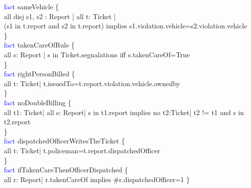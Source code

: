 \textcolor{blue}{fact}
\textcolor{mycolor}{sameVehicle} \{\\
all disj s1, s2 : Report | all t: Ticket |\\
(s1 in t.report and s2 in t.report) implies s1.violation.vehicle=s2.violation.vehicle\\
\}\\
\textcolor{blue}{fact}
\textcolor{mycolor}{takenCareOfRule} \{\\
all s: Report |
s in Ticket.segnalations iff s.takenCareOf=True\\
\}\\
\textcolor{blue}{fact}
\textcolor{mycolor}{rightPersonBilled} \{\\
all t: Ticket| t.issuedTo=t.report.violation.vehicle.ownedby\\
\}\\
\textcolor{blue}{fact}
\textcolor{mycolor}{noDoubleBilling} \{\\
all t1: Ticket| all s: Report|
s in t1.report implies no t2:Ticket| t2 != t1 and s in t2.report\\
\}\\
\textcolor{blue}{fact}
\textcolor{mycolor}{dispatchedOfficerWritesTheTicket} \{\\
all t: Ticket| t.policeman=t.report.dispatchedOfficer\\
\}\\
\textcolor{blue}{fact}
\textcolor{mycolor}{ifTakenCareThenOfficerDispatched} \{\\
all r: Report| r.takenCareOf implies \#r.dispatchedOfficer=1 
\}\\
\\
